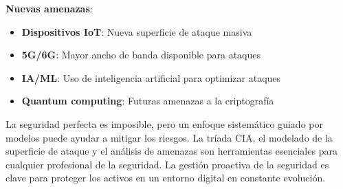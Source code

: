 \textbf{Nuevas amenazas}:
\begin{itemize}
    \item \textbf{Dispositivos IoT}: Nueva superficie de ataque masiva
    \item \textbf{5G/6G}: Mayor ancho de banda disponible para ataques
    \item \textbf{IA/ML}: Uso de inteligencia artificial para optimizar ataques
    \item \textbf{Quantum computing}: Futuras amenazas a la criptografía
\end{itemize}
La seguridad perfecta es imposible, pero un enfoque sistemático guiado por modelos puede ayudar a mitigar los riesgos. La tríada CIA, el modelado de la superficie de ataque y el análisis de amenazas son herramientas esenciales para cualquier profesional de la seguridad. La gestión proactiva de la seguridad es clave para proteger los activos en un entorno digital en constante evolución.
    
